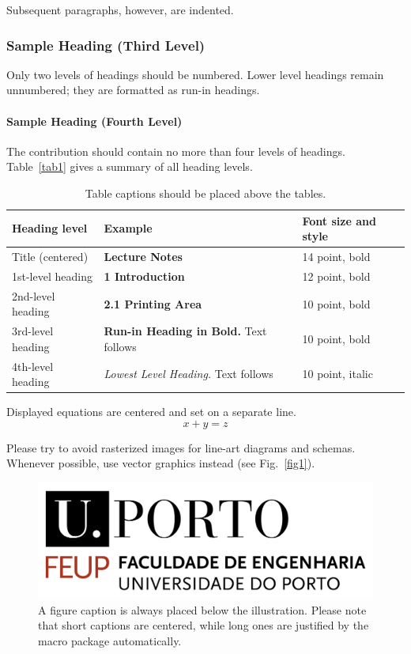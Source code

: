 \documentclass[runningheads]{llncs}
\begin{document}
Subsequent paragraphs, however, are indented.

\subsubsection{Sample Heading (Third Level)} Only two levels of
headings should be numbered. Lower level headings remain unnumbered;
they are formatted as run-in headings.

\paragraph{Sample Heading (Fourth Level)}
The contribution should contain no more than four levels of
headings. Table~\ref{tab1} gives a summary of all heading levels.

\begin{table}
\caption{Table captions should be placed above the
tables.}\label{example_table}
\begin{tabular}{|l|l|l|}
\hline
Heading level &  Example & Font size and style\\
\hline
Title (centered) &  {\Large\bfseries Lecture Notes} & 14 point, bold\\
1st-level heading &  {\large\bfseries 1 Introduction} & 12 point, bold\\
2nd-level heading & {\bfseries 2.1 Printing Area} & 10 point, bold\\
3rd-level heading & {\bfseries Run-in Heading in Bold.} Text follows & 10 point, bold\\
4th-level heading & {\itshape Lowest Level Heading.} Text follows & 10 point, italic\\
\hline
\end{tabular}
\end{table}


\noindent Displayed equations are centered and set on a separate
line.
\begin{equation}
x + y = z
\end{equation}

Please try to avoid rasterized images for line-art diagrams and
schemas. Whenever possible, use vector graphics instead (see
Fig.~\ref{fig1}).

\begin{figure}
\includegraphics[width=\textwidth]{img/FEUPlogo.png}
\caption{A figure caption is always placed below the illustration.
Please note that short captions are centered, while long ones are
justified by the macro package automatically.} \label{fig_example}
\end{figure}
\end{document}
